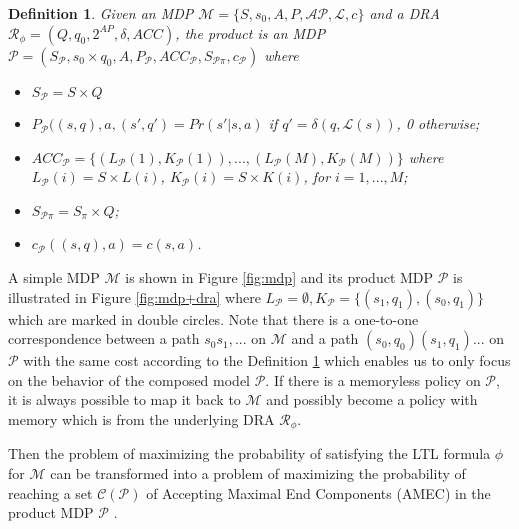 \documentclass[journal]{IEEEtran}
\newtheorem{definition}{Definition}
\begin{document}

\begin{definition}\label{def:DRA_comp} \cite{ding2014optimal}
	Given an MDP $\mathcal{M}=\{S , s_{0} , A , P, \mathcal{AP}, \mathcal{L}, c\}$ and a DRA $\mathcal{R}_{\phi}=(Q,q_0, 2^{AP},\delta, ACC)$, the product is an MDP $\mathcal{P}=(S_{\mathcal{P}},s_0\times q_0, A,P_{\mathcal{P}}, ACC_{\mathcal{P}} , S_{\mathcal{P}\pi}, c_\mathcal{P})$ where
	
	\begin{itemize}
		\item $S_{\mathcal{P}}=S \times Q$
		\item$ P_{\mathcal{P}}((s,q),a,(s',q')=Pr(s'|s,a)$ if $q'=\delta(q,\mathcal{L}(s))$, 0 otherwise;
		\item $ACC_{\mathcal{P}}=\{(L_\mathcal{P}(1),K_\mathcal{P}(1)),...,(L_\mathcal{P}(M),K_\mathcal{P}(M))\}$ where $L_\mathcal{P}(i)=S\times L(i)$, $K_\mathcal{P}(i)=S\times K(i)$, for $i=1,...,M$;
		\item	$S_{\mathcal{P}\pi}=S_{\pi}\times Q$;
		\item $c_\mathcal{P}((s,q),a)=c(s,a)$.
	\end{itemize}
\end{definition}

A simple MDP $\mathcal{M}$ is shown in Figure \ref{fig:mdp} and its product MDP $\mathcal{P}$ is illustrated in Figure \ref{fig:mdp+dra} where $L_\mathcal{P}=\emptyset,K_\mathcal{P}=\{(s_1,q_1),(s_0,q_1)\}$ which are marked in double circles. Note that there is a one-to-one correspondence between a path $s_0s_1,...$ on $\mathcal{M}$ and a path $(s_0,q_0)(s_1,q_1)...$ on $\mathcal{P}$ with the same cost according to the Definition \ref{def:DRA_comp} which enables us to only focus on the behavior of the composed model $\mathcal{P}$. If there is a memoryless policy on $\mathcal{P}$, it is always possible to map it back to $\mathcal{M}$ and possibly become a policy with memory which is from the underlying DRA $\mathcal{R}_\phi$.

Then the problem of maximizing the probability of satisfying the LTL formula $\phi$ for $\mathcal{M}$ can be transformed into a problem of maximizing the probability of reaching a set $\mathcal{C}(\mathcal{P})$ of Accepting Maximal End Components (AMEC) in the product MDP $\mathcal{P}$ \cite{baier2008principles}.  
\end{document}

